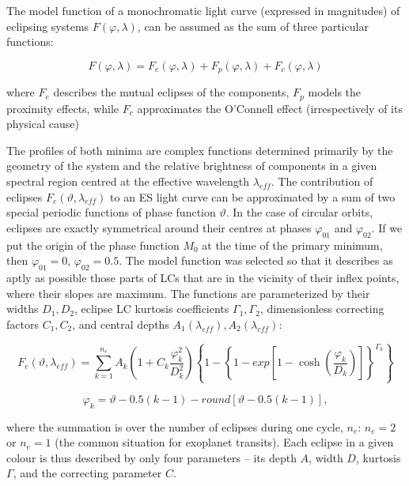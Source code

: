 The model function of a monochromatic light curve (expressed in magnitudes) of eclipsing
systems $F(\varphi, \lambda)$, can be assumed as the sum of three particular functions:

\begin{equation} \label{eq:mik_general}
F(\varphi, \lambda) = F_{e}(\varphi, \lambda) + F_{p}(\varphi, \lambda) + F_{c}(\varphi, \lambda)
\end{equation}

where $F_{e}$ describes the mutual eclipses of the components, $F_{p}$ models the proximity effects,
while $F_{c}$ approximates the O’Connell effect (irrespectively of its physical cause)

The profiles of both minima
are complex functions determined primarily by the geometry
of the system and the relative brightness of components in
a given spectral region centred at the effective wavelength $\lambda_{eff}$.
The contribution of eclipses $F_{e}(\vartheta, \lambda_{eff})$ to an ES light curve can
be approximated by a sum of two special periodic functions of
phase function $\vartheta$. In the case of circular orbits, eclipses are exactly
symmetrical around their centres at phases $\varphi_{01}$ and $\varphi_{02}$. If
we put the origin of the phase function $M_{0}$ at the time of the
primary minimum, then $\varphi_{01} = 0$, $\varphi_{02} = 0.5$.
The model function was selected so that it describes as aptly
as possible those parts of LCs that are in the vicinity of their
inflex points, where their slopes are maximum. The functions
are parameterized by their widths $D_{1}, D_{2}$, eclipse LC kurtosis
coefficients $\Gamma_{1}, \Gamma_{2}$, dimensionless correcting factors $C_{1},C_{2}$, and
central depths $A_{1}(\lambda_{eff}), A_{2}(\lambda_{eff})$:

\begin{equation} \label{eq:mik_main}
F_{e}(\vartheta, \lambda_{eff})=\sum_{k=1}^{n_{e}} A_{k} \left( 1+C_{k} \frac{\varphi_{k}^2}{D_{k}^2}\right) 
\left\lbrace 1-\left\lbrace 
1-exp\left[ 1-\cosh\left(\frac{\varphi_{k}}{D_{k}}\right)\right] 
\right\rbrace^{\Gamma_{k}}\right\rbrace 
\end{equation}

\begin{equation} \label{eq:mik_2}
\varphi_{k} = \vartheta - 0.5 (k - 1) - round \left[ \vartheta - 0.5 (k - 1)\right] ,
\end{equation}

where the summation is over the number of eclipses during one
cycle, $n_{e}$: $n_{e} = 2$ or $n_{e} = 1$ (the common situation for exoplanet
transits). Each eclipse in a given colour is thus described by only
four parameters – its depth $A$, width $D$, kurtosis $\Gamma$, and the correcting
parameter $C$. \parencite{mikulasek2015}

